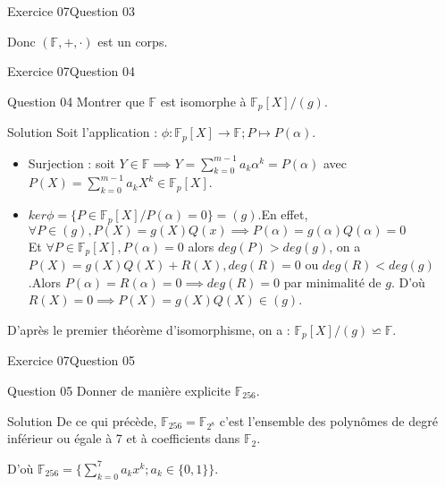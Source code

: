 \documentclass[10pt]{beamer}
\begin{document}
        \begin{frame}{Exercice 07}{Question 03}
            \begin{example}{}
                Donc $(\mathbb{F}, +, \cdot)$ est un corps.
            \end{example}
        \end{frame}

        \begin{frame}{Exercice 07}{Question 04}
            \begin{alertblock}{Question 04}
                Montrer que $\mathbb{F}$ est isomorphe à $\mathbb{F}_p[X]/(g)$.
            \end{alertblock}
            \begin{alertblock}{Solution}
                Soit l'application : $\phi : \mathbb{F}_p[X] \to \mathbb{F}; P \mapsto P(\alpha)$. \pause
                \begin{itemize}
                    \item Surjection : soit $Y \in \mathbb{F} \implies Y = \sum_{k=0}^{m-1} a_k\alpha^k = P(\alpha)$ avec $P(X) = \sum_{k=0}^{m-1} a_kX^k \in \mathbb{F}_p[X]$. \pause
                    \item $ker\phi = \{ P \in \mathbb{F}_p[X] / P(\alpha) = 0\} = (g)$.\pause En effet, $\forall P \in (g), P(X) = g(X)Q(x) \implies P(\alpha) = g(\alpha)Q(\alpha) = 0$ 
                        \\ \pause  Et $\forall P \in \mathbb{F}_p[X], P(\alpha) = 0$
                         alors $deg(P) > deg(g)$, on a $P(X) = g(X)Q(X) + R(X), deg(R) = 0$ ou $deg(R) < deg(g)$.\pause Alors $P(\alpha) = R(\alpha) = 0 \implies deg(R) = 0$ par minimalité de $g$. \pause D'où $R(X) = 0 \implies P(X) = g(X)Q(X) \in (g)$. 
                \end{itemize} \pause
                D'après le premier théorème d'isomorphisme, on a : $\mathbb{F}_p[X]/(g) \backsimeq \mathbb{F}$.
            \end{alertblock}
        \end{frame}

        \begin{frame}{Exercice 07}{Question 05}
            \begin{alertblock}{Question 05}
                Donner de manière explicite $\mathbb{F}_{256}$.
            \end{alertblock}
            \begin{exampleblock}{Solution}
                De ce qui précède, $\mathbb{F}_{256} = \mathbb{F}_{2^8}$ c'est l'ensemble des polynômes de degré inférieur ou égale à 7 et à coefficients dans $\mathbb{F}_2$. \\ \pause
                
                D'où $\mathbb{F}_{256} = \{\sum_{k=0}^{7} a_kx^k; a_k \in\{0,1\}\}$.
            \end{exampleblock}
        \end{frame}
\end{document}
